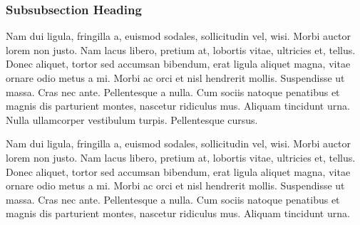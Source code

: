 \documentclass[10pt]{salam}
\begin{document}

\subsubsection{Subsubsection Heading}
Nam dui ligula, fringilla a, euismod sodales, sollicitudin vel, wisi. Morbi auctor lorem non justo. Nam lacus libero, pretium at, lobortis vitae, ultricies et, tellus. Donec aliquet, tortor sed accumsan bibendum, erat ligula aliquet magna, vitae ornare odio metus a mi. Morbi ac orci et nisl hendrerit mollis. Suspendisse ut massa. Cras nec ante. Pellentesque a nulla. Cum sociis natoque penatibus et magnis dis parturient montes, nascetur ridiculus mus. Aliquam tincidunt urna. Nulla ullamcorper vestibulum turpis. Pellentesque cursus.

Nam dui ligula, fringilla a, euismod sodales, sollicitudin vel, wisi. Morbi auctor lorem non justo. Nam lacus libero, pretium at, lobortis vitae, ultricies et, tellus. Donec aliquet, tortor sed accumsan bibendum, erat ligula aliquet magna, vitae ornare odio metus a mi. Morbi ac orci et nisl hendrerit mollis. Suspendisse ut massa. Cras nec ante. Pellentesque a nulla. Cum sociis natoque penatibus et magnis dis parturient montes, nascetur ridiculus mus. Aliquam tincidunt urna.




\end{document}
